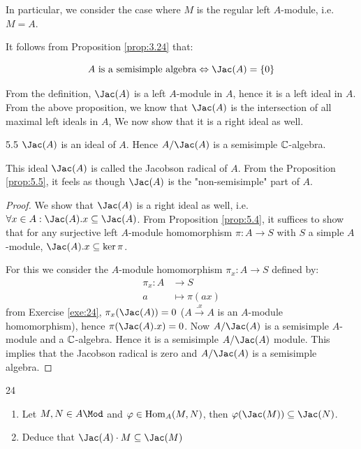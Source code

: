 \documentclass[twoside = false,	%
		headsepline,		%
		parskip = true,
		]{scrbook}						%
\begin{document}
    In particular, we consider the case where $M$ is the regular left $A$-module, i.e. $M=A$.

    It follows from Proposition \ref{prop:3.24} that:

    \begin{equation*}
        A \text{ is a semisimple algebra} \Leftrightarrow \Jac(A) = \{0\}
    \end{equation*}

    From the definition, $\Jac(A)$ is a left $A$-module in $A$, hence it is a left ideal in $A$. From the above proposition, we know that $\Jac(A)$ is the intersection of all maximal left ideals in $A$, We now show that it is a right ideal as well.

    \begin{proposition}{}{5.5}
        $\Jac(A)$ is an ideal of $A$. Hence $A/\Jac(A)$ is a semisimple $\mathbb C$-algebra.
    \end{proposition}

    This ideal $\Jac(A)$ is called the Jacobson radical of $A$. From the Proposition \ref{prop:5.5}, it feels as though $\Jac(A)$ is the "non-semisimple" part of $A$.

    \begin{proof}
        We show that $\Jac(A)$ is a right ideal as well, i.e. $\forall x \in A: \Jac(A).x\subseteq \Jac(A)$. From Proposition \ref{prop:5.4}, it suffices to show that for any surjective left $A$-module homomorphism $\pi: A \to S$ with $S$ a simple $A$-module, $\Jac(A).x \subseteq \ker \pi$.

        For this we consider the $A$-module homomorphism $\pi_x: A \to S$ defined by:
        \begin{equation*}
        \begin{split}
            \pi_x: A &\to S \\
            a &\mapsto \pi(ax)
        \end{split}
        \end{equation*}
        from Exercise \ref{exe:24}, $\pi_x(\Jac(A)) = 0$ ($A \xrightarrow{.x} A$ is an $A$-module homomorphism), hence $\pi(\Jac(A).x) = 0$. Now $A/\Jac(A)$ is a semisimple $A$-module and a $\mathbb C$-algebra. Hence it is a semisimple $A/\Jac(A)$ module. This implies that the Jacobson radical is zero and $A/\Jac(A)$ is a semisimple algebra.
    \end{proof}

    \begin{exercise}{}{24}
        \begin{enumerate}
            \item Let $M,N \in A\Mod$ and $\varphi \in \mathrm{Hom}_A(M,N)$, then $\varphi(\Jac(M)) \subseteq \Jac(N)$.
            \item Deduce that $\Jac(A)\cdot M \subseteq \Jac(M)$
        \end{enumerate}
    \end{exercise}
\end{document}
